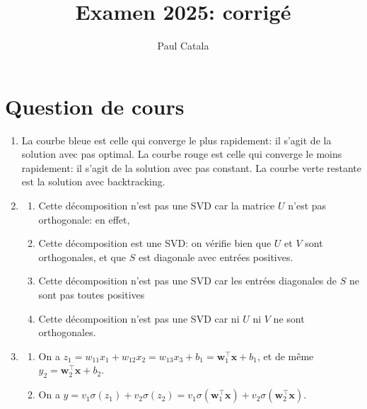 \documentclass{article}
\title{Examen 2025: corrigé}
\date{}
\author{Paul Catala}
\begin{document}
\maketitle

\section{Question de cours}

\begin{enumerate}
	\item La courbe bleue est celle qui converge le plus rapidement: il s'agit de la solution avec pas optimal. La courbe rouge est celle qui converge le moins rapidement: il s'agit de la solution avec pas constant. La courbe verte restante est la solution avec backtracking.
	
	\item 
	\begin{enumerate}
		\item Cette décomposition n'est pas une SVD car la matrice $U$ n'est pas orthogonale: en effet, 
		
		\item Cette décomposition est une SVD: on vérifie bien que $U$ et $V$ sont orthogonales, et que $S$ est diagonale avec entrées positives.
		
		\item Cette décomposition n'est pas une SVD car les entrées diagonales de $S$ ne sont pas toutes positives
		
		\item Cette décomposition n'est pas une SVD car ni $U$ ni $V$ ne sont orthogonales.
	\end{enumerate}
		
	\item 
	\begin{enumerate}
		\item On a $z_1 = w_{11}x_1 + w_{12}x_2 = w_{13}x_3 + b_1 = \mathbf{w}_1^\top \mathbf{x} + b_1$, et de même $y_2 = \mathbf{w}_2^\top \mathbf{x} + b_2$.
		\item On a $y = v_1 \sigma(z_1) + v_2 \sigma(z_2) = v_1 \sigma(\mathbf{w}_1^\top \mathbf{x}) + v_2 \sigma(\mathbf{w}_2^\top \mathbf{x})$.
	\end{enumerate}
\end{enumerate}
	
\end{document}
